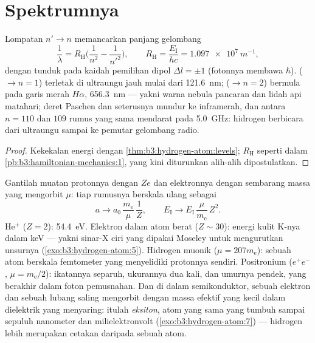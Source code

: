 \section{Spektrumnya}

\begin{proposition}\label{prop:b3:hydrogen-atom:series}
Lompatan $n' \to n$ memancarkan panjang gelombang
\[
\frac{1}{\lambda} = R_{\text{H}}\Big(\frac{1}{n^2} -
\frac{1}{n'^2}\Big) , \qquad
R_{\text{H}} = \frac{E_{\text{I}}}{hc} = \qty{1.097e7}{m^{-1}} ,
\]
dengan tunduk pada kaidah pemilihan dipol $\Delta l = \pm1$ (fotonnya
membawa $\hbar$).  ($\to n = 1$) terletak di ultraungu jauh
mulai dari \qty{121.6}{nm};  ($\to n = 2$)
bermula pada garis merah $H\alpha$, \qty{656.3}{nm} --- yakni warna
nebula pancaran dan lidah api matahari; deret Paschen dan seterusnya
mundur ke inframerah, dan antara $n = 110$ dan $109$ rumus yang sama
mendarat pada \qty{5.0}{GHz}: hidrogen berbicara dari ultraungu sampai
ke pemutar gelombang radio.
\end{proposition}

\begin{proof}
Kekekalan energi dengan \cref{thm:b3:hydrogen-atom:levels};
$R_{\text{H}}$ seperti dalam \cref{pb:b3:hamiltonian-mechanics:1}, yang
kini diturunkan alih-alih dipostulatkan.
\end{proof}

\begin{example}\label{ex:b3:hydrogen-atom:scaling}
Gantilah muatan protonnya dengan $Ze$ dan elektronnya dengan sembarang
massa yang mengorbit $\mu$: tiap rumusnya berskala ulang sebagai
\[
a \to a_0\,\frac{m_{\text{e}}}{\mu}\,\frac1Z , \qquad
E_{\text{I}} \to E_{\text{I}}\,\frac{\mu}{m_{\text{e}}}\,Z^2 .
\]
He$^+$ ($Z = 2$): \qty{54.4}{eV}. Elektron dalam atom berat
($Z \sim 30$): energi kulit K-nya dalam keV --- yakni sinar-X ciri yang
dipakai Moseley untuk mengurutkan unsurnya
(\cref{exo:b3:hydrogen-atom:5}). Hidrogen muonik ($\mu = 207
m_{\text{e}}$): sebuah atom berskala femtometer yang menyelidiki
protonnya sendiri. Positronium ($e^+e^-$, $\mu = m_{\text{e}}/2$):
ikatannya separuh, ukurannya dua kali, dan umurnya pendek, yang berakhir
dalam foton pemusnahan. Dan di dalam semikonduktor, sebuah elektron dan
sebuah lubang saling mengorbit dengan massa efektif yang kecil dalam
dielektrik yang menyaring: itulah \emph{eksiton}, atom yang sama yang
tumbuh sampai sepuluh nanometer dan milielektronvolt
(\cref{exo:b3:hydrogen-atom:7}) --- hidrogen lebih merupakan cetakan
daripada sebuah atom.
\end{example}

